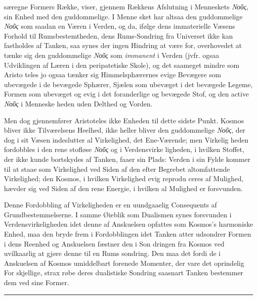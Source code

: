 \documentclass[12pt,a4paper]{book}
\newcommand{\divrule}{\begin{center}\rule{2cm}{0.4pt}\end{center}}
\newcommand{\dblrule}{\begin{center}%
  \rule{2cm}{0.4pt}\\[1.2pt]\rule{2cm}{0.4pt}\end{center}}
\newcommand{\gk}[1]{\textit{#1}}
\begin{document}
særegne Formers Række, viser, gjennem Rækkens Afslutning i
Menneskets \gk{Νοῦς}, sin Enhed med den guddommelige. I Menne\-%
sket har altsaa den guddommelige \gk{Νοῦς} som saadan en Væren
i Verden, og da, ifølge dens immaterielle Væsens Forhold til
Rumsbestemtheden, dens Rums-Sondring fra Universet ikke
kan fastholdes af Tanken, saa synes der ingen Hindring at
være for, overhovedet at tænke sig den guddommelige \gk{Νοῦς}
som \emph{immanent} i Verden (jvfr. ogsaa Udviklingen af Læren i
den peripatetiske Skole), og det saameget mindre som Aristo\-%
teles jo ogsaa tænker sig Himmelsphærernes evige Bevægere
som ubevægede i de bevægede Sphærer, Sjælen som ubevæget
i det bevægede Legeme, Formen som ubevæget og evig i det
foranderlige og bevægede Stof, og den active \gk{Νοῦς} i Menneske\-%
heden uden Delthed og Vorden.

Men dog gjennemfører Aristoteles ikke Enheden til dette
sidste Punkt. Kosmos bliver ikke Tilværelsens Heelhed, ikke
heller bliver den guddommelige \gk{Νοῦς}, der dog i sit Væsen
indeslutter al Virkelighed, det Ene-Værende; men Virkelig\-%
heden fordobbles i den rene stofløse \gk{Νοῦς} og i Verdensvirke\-%
ligheden, i hvilken Stoffet, der ikke kunde bortskydes af Tanken,
faaer sin Plads: Verden i sin Fylde kommer til at staae som
Virkelighed ved Siden af den efter Begrebet altomfattende
Virkelighed; den Kosmos, i hvilken Virkelighed evig reprodu\-%
ceres af Mulighed, hævder sig ved Siden af den rene Energie,
i hvilken al Mulighed er forsvunden.

Denne Fordobbling af Virkeligheden er en uundgaaelig
Consequents af Grundbestemmelserne. I samme Øieblik som
Dualismen synes forsvunden i Verdensvirkeligheden idet denne
af Anskuelsen opfattes som Kosmos's harmoniske Enhed, maa
den bryde frem i Fordobblingen idet Tanken atter udsondrer
Formen i dens Reenhed og Anskuelsen fæstner den i Son\-%
dringen fra Kosmos ved uvilkaarlig at gjøre denne til en Rums\-%
sondring. Den maa det fordi de i Anskuelsen af Kosmos
umiddelbart forenede Momenter, der vare det oprindelig For\-%
skjellige, strax røbe deres dualistiske Sondring saasnart Tanken
bestemmer dem ved sine Former.
\divrule
\end{document}
